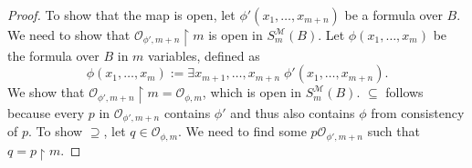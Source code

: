 \documentclass{article}
\begin{document}
\begin{enumerate}[label={\bf Q\arabic*:}]
\begin{enumerate}
\begin{proof}
          To show that the map is open, let $\phi'(x_1,\ldots,x_{m+n})$ be
          a formula over $B$. We need to show that
          $\mathcal{O}_{\phi',m+n}\restriction m$ is open in
          $S^{\mathcal{M}}_{m}(B)$. Let $\phi(x_1,\ldots,x_m)$ be the
          formula over $B$ in $m$ variables, defined as
          \[\phi(x_1,\ldots,x_m) := \exists x_{m+1},\ldots,x_{m+n}\;
          \phi'(x_1,\ldots,x_{m+n}).\] We show that
          $\mathcal{O}_{\phi',m+n}\restriction m=\mathcal{O}_{\phi,m}$,
          which is open in $S^{\mathcal{M}}_{m}(B)$. $\subseteq$ follows
          because every $p$ in $\mathcal{O}_{\phi',m+n}$ contains $\phi'$
          and thus also contains $\phi$ from consistency of $p$. To show
          $\supseteq$, let $q\in\mathcal{O}_{\phi,m}$. We need to find some
          $p\mathcal{O}_{\phi',m+n}$ such that $q=p\restriction m$.
        \end{proof}
    \end{enumerate}
\end{enumerate}
\end{document}

